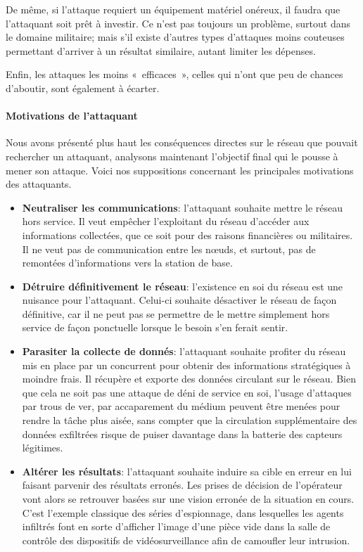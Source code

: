 De même, si l'attaque requiert un équipement matériel onéreux, il faudra que l'attaquant soit prêt à investir.
Ce n'est pas toujours un problème, surtout dans le domaine militaire; mais s'il existe d'autres types d'attaques moins couteuses permettant d'arriver à un résultat similaire, autant limiter les dépenses.

Enfin, les attaques les moins « efficaces », celles qui n'ont que peu de chances d'aboutir, sont également à écarter.

        \paragraph{Motivations de l'attaquant}
Nous avons présenté plus haut les conséquences directes sur le réseau que pouvait rechercher un attaquant, analysons maintenant l'objectif final qui le pousse à mener son attaque.
Voici nos suppositions concernant les principales motivations des attaquants.
\begin{itemize}
    \item \textbf{Neutraliser les communications}: l'attaquant souhaite mettre le réseau hors service. Il veut empêcher l'exploitant du réseau d'accéder aux informations collectées, que ce soit pour des raisons financières ou militaires. Il ne veut pas de communication entre les nœuds, et surtout, pas de remontées d'informations vers la station de base.
    \item \textbf{Détruire définitivement le réseau}: l'existence en soi du réseau est une nuisance pour l'attaquant. Celui-ci souhaite désactiver le réseau de façon définitive, car il ne peut pas se permettre de le mettre simplement hors service de façon ponctuelle lorsque le besoin s'en ferait sentir.
    \item \textbf{Parasiter la collecte de donnés}: l'attaquant souhaite profiter du réseau mis en place par un concurrent pour obtenir des informations stratégiques à moindre frais. Il récupère et exporte des données circulant sur le réseau. Bien que cela ne soit pas une attaque de déni de service en soi, l'usage d'attaques par trous de ver, par accaparement du médium peuvent être menées pour rendre la tâche plus aisée, sans compter que la circulation supplémentaire des données exfiltrées risque de puiser davantage dans la batterie des capteurs légitimes.
    \item \textbf{Altérer les résultats}: l'attaquant souhaite induire sa cible en erreur en lui faisant parvenir des résultats erronés. Les prises de décision de l'opérateur vont alors se retrouver basées sur une vision erronée de la situation en cours. C'est l'exemple classique des séries d'espionnage, dans lesquelles les agents infiltrés font en sorte d'afficher l'image d'une pièce vide dans la salle de contrôle des dispositifs de vidéosurveillance afin de camoufler leur intrusion.
\end{itemize}

